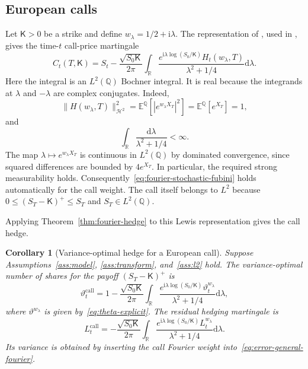 \documentclass[11pt]{article}
\newtheorem{corollary}[theorem]{Corollary}
\theoremstyle{definition}
\theoremstyle{remark}
\newcommand{\R}{\mathbb{R}}
\newcommand{\E}{\mathbb{E}}
\newcommand{\Q}{\mathbb{Q}}
\newcommand{\1}{\mathbf{1}}
\newcommand{\dd}{\mathrm{d}}
\newcommand{\cK}{\mathsf{K}}
\begin{document}
\subsection{European calls}

Let $\cK>0$ be a strike and define $w_\lambda=1/2+\mathrm{i}\lambda$. The
representation of \citet{lewis2001}, used in \citet{bondi2024}, gives the
time-$t$ call-price martingale
\begin{equation}
\label{eq:conditional-call}
 C_t(T,\cK)
 =S_t-\frac{\sqrt{S_0\cK}}{2\pi}
  \int_\R
   \frac{e^{\mathrm{i}\lambda\log(S_0/\cK)}H_t(w_\lambda,T)}
        {\lambda^2+1/4}\dd\lambda.
\end{equation}
Here the integral is an $L^2(\Q)$ Bochner integral. It is real because the
integrands at $\lambda$ and $-\lambda$ are complex conjugates. Indeed,
\[
 \|H(w_\lambda,T)\|_{\mathcal H^2}^2
 =\E^\Q[|e^{w_\lambda X_T}|^2]
 =\E^\Q[e^{X_T}]=1,
\]
and
\[
 \int_\R\frac{\dd\lambda}{\lambda^2+1/4}<\infty.
\]
The map $\lambda\mapsto e^{w_\lambda X_T}$ is continuous in $L^2(\Q)$
by dominated convergence, since squared differences are bounded by
$4e^{X_T}$. In particular, the required strong measurability holds.
Consequently~\eqref{eq:fourier-stochastic-fubini} holds automatically for the
call weight. The call itself belongs to $L^2$ because
$0\leq(S_T-\cK)^+\leq S_T$ and $S_T\in L^2(\Q)$.

Applying Theorem~\ref{thm:fourier-hedge} to this Lewis representation gives
the call hedge.

\begin{corollary}[Variance-optimal hedge for a European call]
\label{cor:call-hedge}
Suppose Assumptions~\ref{ass:model}, \ref{ass:transform}, and~\ref{ass:l2}
hold. The variance-optimal number of shares for the payoff $(S_T-\cK)^+$ is
\begin{equation}
 \vartheta_t^{\mathrm{call}}
 =1-\frac{\sqrt{S_0\cK}}{2\pi}
  \int_\R
   \frac{e^{\mathrm{i}\lambda\log(S_0/\cK)}\vartheta_t^{w_\lambda}}
        {\lambda^2+1/4}\dd\lambda,
\label{eq:call-hedge}
\end{equation}
where $\vartheta^{w_\lambda}$ is given by~\eqref{eq:theta-explicit}. The
residual hedging martingale is
\begin{equation}
\label{eq:call-residual}
 L_t^{\mathrm{call}}
 =-\frac{\sqrt{S_0\cK}}{2\pi}
  \int_\R
   \frac{e^{\mathrm{i}\lambda\log(S_0/\cK)}L_t^{w_\lambda}}
        {\lambda^2+1/4}\dd\lambda.
\end{equation}
Its variance is obtained by inserting the call Fourier weight
into~\eqref{eq:error-general-fourier}.
\end{corollary}
\end{document}
